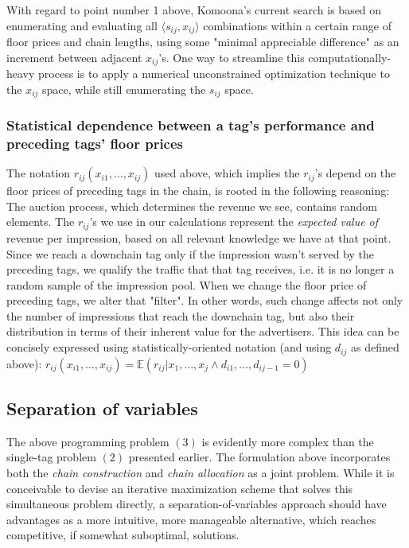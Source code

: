 \documentclass{article}
\begin{document}
\begin{large}
With regard to point number 1 above, Komoona's current search is based on enumerating and evaluating all $ \big \langle s_{ij},x_{ij} \big \rangle $ combinations within a certain range of floor prices and chain lengths, using some "minimal appreciable difference" as an increment between adjacent $x_{ij}$'s.  One way to streamline this computationally-heavy process is to apply a numerical unconstrained optimization technique to the $x_{ij}$ space, while still enumerating the $s_{ij}$ space. 


\subsubsection{Statistical dependence between a tag's performance and preceding tags' floor prices}
The notation $r_{ij}(x_{i1},\dots, x_{ij})$ used above, which implies the $r_{ij}$'s depend on the floor prices of preceding tags in the chain, is rooted in the following reasoning: The auction process, which determines the revenue we see, contains random elements. The $r_{ij}$'s we use in our calculations represent the \emph{expected value of} revenue per impression, based on all relevant knowledge we have at that point. Since we reach a downchain tag only if the impression wasn't served by the preceding tags, we qualify the traffic that that tag receives, i.e. it is no longer a random sample of the impression pool. When we change the floor price of preceding tags, we alter that "filter". In other words, such change affects not only the number of  impressions that reach the downchain tag, but also their distribution in terms of their inherent value for the advertisers. This idea can be concisely expressed using  statistically-oriented notation (and using $d_{ij}$ as defined above):
$r_{ij}(x_{i1},\dots, x_{ij}) =
\mathbb{E} (r_{ij}|x_1,\dots, x_j \wedge d_{i1}, \dots, d_{ij-1}=0)$

\iffalse
\subsection{Separation of variables}

The above programming problem $(3)$ is evidently more complex than the single-tag problem $(2)$ presented earlier. The formulation above incorporates both the \emph{chain construction} and \emph{chain allocation} as a joint problem. While it is conceivable to devise an iterative maximization scheme that solves this simultaneous problem directly, a separation-of-variables approach should have advantages as a more intuitive, more manageable alternative, which reaches competitive, if somewhat suboptimal, solutions. 


\end{large}
\end{document}
